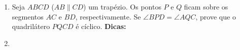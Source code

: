 \documentclass{article}
\newcommand{\dica}{\textbf{Dicas:}}
\begin{document}
\begin{multicols}{2}
\begin{enumerate}
    \item Seja $ABCD$ ($AB\parallel CD$) um trapézio. Os pontos $P$ e $Q$ ficam sobre os segmentos $AC$ e $BD$, respectivamente. Se $\angle BPD=\angle AQC$, prove que o quadrilátero $PQCD$ é cíclico. \dica %
    
    \item 
    
    
    
    
    
    
    
    
    
\end{enumerate}
\end{multicols}
\end{document}
